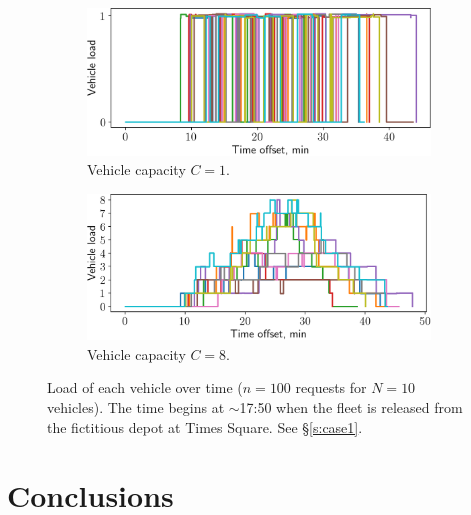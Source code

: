 \documentclass[12pt,notitlepage]{article}
\begin{document}
\begin{figure}[!p]
	\begin{subfigure}{0.5\textwidth}
		\includegraphics[width=\textwidth]{20210616-OPT1/c_grid_study0/UTC-20210619-074952/plots/8/vehicle_load}
		\caption{Vehicle capacity $C = 1$.}
	\end{subfigure}
	\begin{subfigure}{0.5\textwidth}
		\includegraphics[width=\textwidth]{20210616-OPT1/c_grid_study0/UTC-20210619-074952/plots/9/vehicle_load}
		
		\caption{Vehicle capacity $C = 8$.}
	\end{subfigure}
	
	\caption{%
		Load of each vehicle over time
		($n = 100$ requests for $N = 10$ vehicles).
		The time begins at $\sim$17:50 
		when the fleet is released 
		from the fictitious depot
		at Times Square.
		See \S\ref{s:case1}.
	}
	\label{f:case1-load}
\end{figure}








\section{Conclusions}

\end{document}
